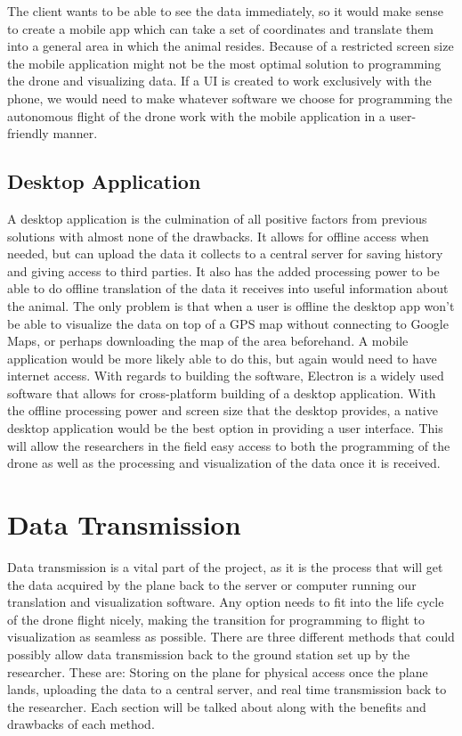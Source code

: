 \documentclass[onecolumn, draftclsnofoot,10pt, compsoc]{IEEEtran}
\begin{document}
The client wants to be able to see the data immediately, so it would make sense to create a mobile app which can take a set of coordinates and translate them into a general area in which the animal resides. Because of a restricted screen size the mobile application might not be the most optimal solution to programming the drone and visualizing data. If a UI is created to work exclusively with the phone, we would need to make whatever software we choose for programming the autonomous flight of the drone work with the mobile application in a user-friendly manner.

\subsection{Desktop Application}

A desktop application is the culmination of all positive factors from previous solutions with almost none of the drawbacks. It allows for offline access when needed, but can upload the data it collects to a central server for saving history and giving access to third parties. It also has the added processing power to be able to do offline translation of the data it receives into useful information about the animal. The only problem is that when a user is offline the desktop app won't be able to visualize the data on top of a GPS map without connecting to Google Maps, or perhaps downloading the map of the area beforehand. A mobile application would be more likely able to do this, but again would need to have internet access. With regards to building the software, Electron is a widely used software that allows for cross-platform building of a desktop application\cite{Electron}. With the offline processing power and screen size that the desktop provides, a native desktop application would be the best option in providing a user interface. This will allow the researchers in the field easy access to both the programming of the drone as well as the processing and visualization of the data once it is received.

\section{Data Transmission}

Data transmission is a vital part of the project, as it is the process that will get the data acquired by the plane back to the server or computer running our translation and visualization software. Any option needs to fit into the life cycle of the drone flight nicely, making the transition for programming to flight to visualization as seamless as possible. There are three different methods that could possibly allow data transmission back to the ground station set up by the researcher. These are: Storing on the plane for physical access once the plane lands, uploading the data to a central server, and real time transmission back to the researcher. Each section will be talked about along with the benefits and drawbacks of each method.
\end{document}
